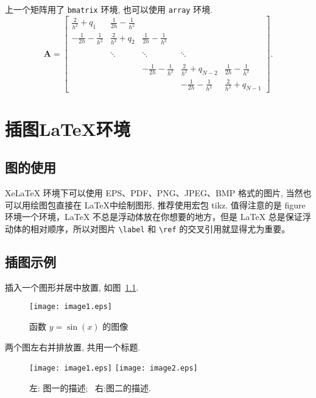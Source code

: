 \documentclass[openany,twoside,12pt]{book}
\theoremstyle{plain}
\begin{document}
上一个矩阵用了 \verb|bmatrix| 环境, 也可以使用 \verb|array| 环境.
\begin{equation}\label{equ:matrix2}
\boldsymbol{A}=\left[\begin{array}{cccccc}
\frac{2}{h^{2}}+q_{1} & \frac{1}{2h}-\frac{1}{h^{2}} &   &  &  \\[8pt]
 -\frac{1}{2h}-\frac{1}{h^{2}} & \frac{2}{h^{2}}+q_{2} & \frac{1}{2h}-\frac{1}{h^{2}}  & &  \\[8pt]
  &  &  &  &    \\
  &  \ddots  & \ddots  &  \ddots  &  \\[8pt]
  &  &  &  &    \\
  &   & -\frac{1}{2h}-\frac{1}{h^{2}} & \frac{2}{h^{2}}+q_{N-2}& \frac{1}{2h}-\frac{1}{h^{2}} \\[8pt]
  &  &  & -\frac{1}{2h}-\frac{1}{h^{2}} & \frac{2}{h^{2}}+q_{N-1}
\end{array}\right].
\end{equation}



\chapter{插图LaTeX环境}

\section{图的使用}

XeLaTeX 环境下可以使用 EPS、PDF、PNG、JPEG、BMP 格式的图片, 当然也可以用绘图包直接在 \LaTeX 中绘制图形, 推荐使用宏包 tikz. 值得注意的是 figure 环境一个环境，LaTeX 不总是浮动体放在你想要的地方，但是 LaTeX 总是保证浮动体的相对顺序，所以对图片 \verb|\label| 和 \verb|\ref| 的交叉引用就显得尤为重要。

\section{插图示例}

插入一个图形并居中放置, 如图~\ref{fig:sinx}.
\begin{figure}[htp!]
  \centering
  \texttt{[image: image1.eps]}
  \caption{函数 $y=\sin(x)$ 的图像}\label{fig:sinx}
\end{figure}

\clearpage
两个图左右并排放置, 共用一个标题.
\begin{figure}[htp!]
  \centering
  \texttt{[image: image1.eps]}
  \hfill
  \texttt{[image: image2.eps]}
  \caption{左: 图一的描述;~ 右:图二的描述.}
  \label{fig:image}
\end{figure}
\end{document}

